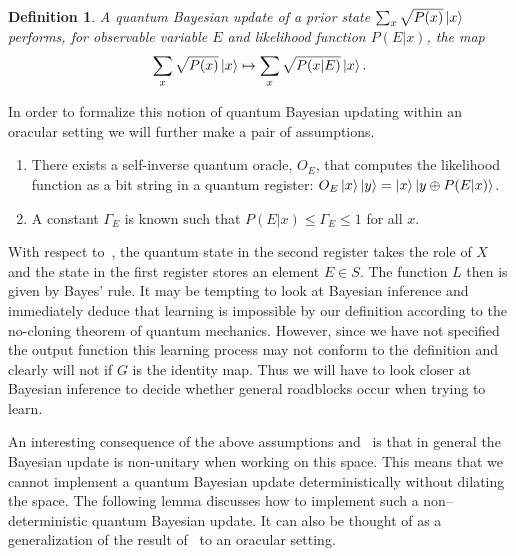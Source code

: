 \documentclass[aps,amsmath,onecolumn,amssymb,notitlepage]{revtex4-1}
\newtheorem{definition}{Definition}
\begin{document}
\begin{definition}\label{def:qbayes}
A quantum Bayesian update of a prior state $\sum_x \sqrt{P(x)} \left|x\right\rangle$ performs, for observable variable $E$ and likelihood function $P(E|x)$, the map 
$$\sum_x \sqrt{P(x)} \left|x\right\rangle\mapsto  \sum_x \sqrt{P(x|E)} \left|x\right\rangle. $$
\end{definition}

In order to formalize this notion of quantum Bayesian updating within an oracular setting we will further make a pair of assumptions.
\begin{enumerate}
\item There exists a self-inverse quantum oracle, $O_E$, that computes the likelihood function as a bit string in a quantum register: $O_E\left|x\right\rangle\left|y\right\rangle = \left|x\right\rangle\left|y\oplus P(E|x)\right\rangle$.
\item A constant $\Gamma_E$ is known such that $P(E|x) \le \Gamma_E \le 1$ for all $x$.
\end{enumerate}

With respect to~, the quantum state in the second register takes the role of $X$ and the state in the first register stores an element $E\in S$.  The function $L$ then is given by Bayes' rule.  It may be tempting to look at Bayesian inference and immediately deduce that learning is impossible by our definition according to the no-cloning theorem of quantum mechanics.  However, since we have not specified the output function this learning process may not conform to the definition and clearly will not if $G$ is the identity map.  Thus we will have to look closer at Bayesian inference to decide whether general roadblocks occur when trying to learn.

An interesting consequence of the above assumptions and~ is that in general the Bayesian update is non-unitary when working on this space.  This means that we cannot  implement a quantum Bayesian update deterministically without dilating the space.
The following lemma discusses how to implement such a non--deterministic quantum Bayesian update.  It can also be thought of as a generalization of the result of~\cite{LYC14} to an oracular setting.
\end{document}
